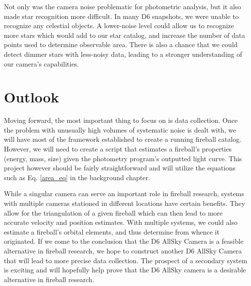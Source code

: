 Not only was the camera noise problematic for photometric analysis, but it also made star recognition more difficult.
In many D6 snapshots, we were unable to recognize any celestial objects.
A lower-noise level could allow us to recognize more stars which would add to our star catalog, and increase the number of data points used to determine observable area.
There is also a chance that we could detect dimmer stars with less-noisy data, leading to a stronger understanding of our camera's capabilities.

\section{Outlook}

Moving forward, the most important thing to focus on is data collection.
Once the problem with unusually high volumes of systematic noise is dealt with, we will have most of the framework established to create a running fireball catalog.
However, we will need to create a script that estimates a fireball's properties (energy, mass, size) given the photometry program's outputted light curve.
This project however should be fairly straightforward and will utilize the equations such as Eq. \ref{area_eq} in the background chapter.

While a singular camera can serve an important role in fireball research, systems with multiple cameras stationed in different locations have certain benefits.
They allow for the triangulation of a given fireball which can then lead to more accurate velocity and position estimates.
With multiple systems, we could also estimate a fireball's orbital elements, and thus determine from whence it originated.
If we come to the conclusion that the D6 AllSky Camera is a feasible alternative in fireball research, we hope to construct another D6 AllSky Camera that will lead to more precise data collection. 
The prospect of a secondary system is exciting and will hopefully help prove that the D6 AllSky camera is a desirable alternative in fireball research.